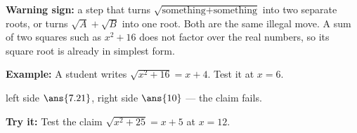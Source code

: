 \documentclass[12pt]{article}
\begin{document}

\begin{formulabox}
\textbf{Warning sign:} a step that turns $\sqrt{\text{something} + \text{something}}$
into two separate roots, or turns $\sqrt{A}+\sqrt{B}$ into one root. Both are the
same illegal move. A sum of two squares such as $x^2+16$ does not factor over the
real numbers, so its square root is already in simplest form.
\end{formulabox}

\begin{examplebox}
\textbf{Example:} \quad A student writes $\sqrt{x^2+16} = x+4$. Test it at
$x = 6$.

left side $\ans{7.21}$, \quad right side $\ans{10}$ --- the claim fails.
\end{examplebox}

\begin{tryitbox}
\textbf{Try it:} \quad Test the claim $\sqrt{x^2+25} = x+5$ at $x = 12$.\\[2pt]
\end{tryitbox}
\end{document}
